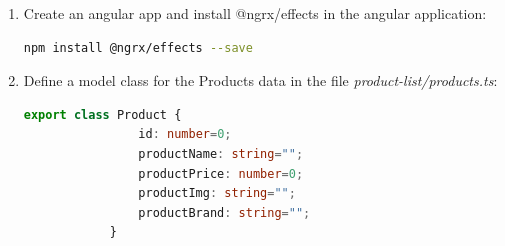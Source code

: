 \documentclass{report}
\begin{document}
\begin{enumerate}

	\item{Create an angular app and install @ngrx/effects in the angular application:}
		\begin{lstlisting}[language=bash]
			npm install @ngrx/effects --save
	\end{lstlisting}

\item{Define a model class for the Products data in the file \textit{product-list/products.ts}:}
		\begin{lstlisting}[caption=product-list/products.ts, language=Typescript]
			export class Product {
				id: number=0;
				productName: string="";
				productPrice: number=0;
				productImg: string="";
				productBrand: string="";
			}
\end{lstlisting}


\end{enumerate}
\end{document}
